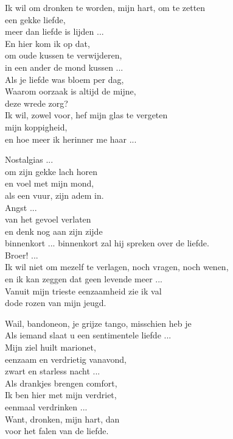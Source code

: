 \clearpage
\begin{translation}
Ik wil om dronken te worden, mijn hart, om te zetten\\
een gekke liefde,\\
meer dan liefde is lijden ...\\
En hier kom ik op dat,\\
om oude kussen te verwijderen,\\
in een ander de mond kussen ...\\
Als je liefde was bloem per dag,\\
Waarom oorzaak is altijd de mijne,\\
deze wrede zorg?\\
Ik wil, zowel voor, hef mijn glas te vergeten\\
mijn koppigheid,\\
en hoe meer ik herinner me haar ...\vspace{\wlskip}

Nostalgias ...\\
om zijn gekke lach horen\\
en voel met mijn mond,\\
als een vuur, zijn adem in.\\
Angst ...\\
van het gevoel verlaten\\
en denk nog aan zijn zijde\\
binnenkort ... binnenkort zal hij spreken over de liefde.\\
Broer! ...\\
Ik wil niet om mezelf te verlagen, noch vragen, noch wenen,\\
en ik kan zeggen dat geen levende meer ...\\
Vanuit mijn trieste eenzaamheid zie ik val\\
dode rozen van mijn jeugd.\vspace{\wlskip}

Wail, bandoneon, je grijze tango, misschien heb je\\
Als iemand slaat u een sentimentele liefde ...\\
Mijn ziel huilt marionet,\\
eenzaam en verdrietig vanavond,\\
zwart en starless nacht ...\\
Als drankjes brengen comfort,\\
Ik ben hier met mijn verdriet,\\
eenmaal verdrinken ...\\
Want, dronken, mijn hart, dan\\
voor het falen van de liefde.\vspace{\wlskip}


\end{translation}
